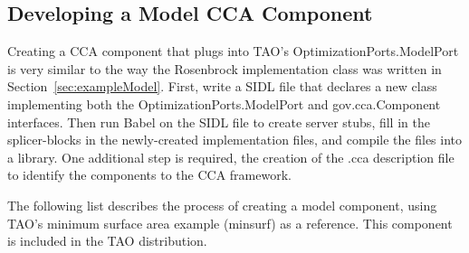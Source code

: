 \documentclass[doublespacing,12pt]{article}
\begin{document}
\subsection{Developing a Model CCA Component}\label{sec:exampleServer}
Creating a CCA component that plugs into TAO's 
\textsf{Op\-ti\-mi\-za\-tion\-Ports.ModelPort}
is very similar to the way the Rosenbrock implementation class
was written in Section~\ref{sec:exampleModel}.  First, write a SIDL
file that declares a new class implementing both the 
\textsf{OptimizationPorts.ModelPort} and \textsf{gov.cca.Component}
interfaces.
Then
run Babel on the SIDL file to create server stubs, fill in the
splicer-blocks in the newly-created implementation files, and compile
the files into a library.  One additional step is required, the
creation of the .cca description file to identify the
components to the CCA framework.

The following list describes the process of creating a model
component, using TAO's minimum surface area example (minsurf) as a reference.
This component is included in the TAO distribution.
\end{document}
